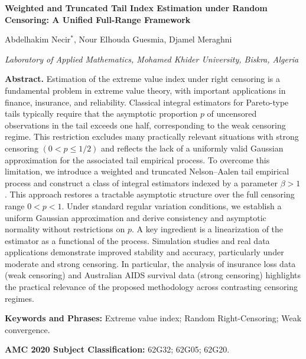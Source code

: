\documentclass[reqno,openbib,runningheads,a4paper,12pt]{amsart}%
\begin{document}
\begin{center}
{\large \textbf{Weighted and Truncated Tail Index Estimation under Random
Censoring: A Unified Full-Range Framework}}\bigskip

{\large Abdelhakim Necir}$^{\ast}${\large , Nour Elhouda Guesmia, Djamel
Meraghni}\medskip\newline

{\small \textit{Laboratory of Applied Mathematics, Mohamed Khider University,
Biskra, Algeria}}\medskip\medskip
\end{center}

\noindent\textbf{Abstract.} Estimation of the extreme value index under right
censoring is a fundamental problem in extreme value theory, with important
applications in finance, insurance, and reliability. Classical integral
estimators for Pareto-type tails typically require that the asymptotic
proportion $p$ of uncensored observations in the tail exceeds one half,
corresponding to the weak censoring regime. This restriction excludes many
practically relevant situations with strong censoring $(0<p\leq1/2)$ and
reflects the lack of a uniformly valid Gaussian approximation for the
associated tail empirical process. To overcome this limitation, we introduce a
weighted and truncated Nelson--Aalen tail empirical process and construct a
class of integral estimators indexed by a parameter $\beta>1$. This approach
restores a tractable asymptotic structure over the full censoring range
$0<p<1$. Under standard regular variation conditions, we establish a uniform
Gaussian approximation and derive consistency and asymptotic normality without
restrictions on $p$. A key ingredient is a linearization of the estimator as a
functional of the process. Simulation studies and real data applications
demonstrate improved stability and accuracy, particularly under moderate and
strong censoring. In particular, the analysis of insurance loss data (weak
censoring) and Australian AIDS survival data (strong censoring) highlights the
practical relevance of the proposed methodology across contrasting censoring
regimes.\medskip

\noindent\textbf{Keywords and Phrases:} Extreme value index; Random
Right-Censoring; Weak convergence.\medskip

\noindent\textbf{AMC 2020 Subject Classification:} 62G32; 62G05; 62G20.

\vfill


\vfill


\newline
\end{document}
